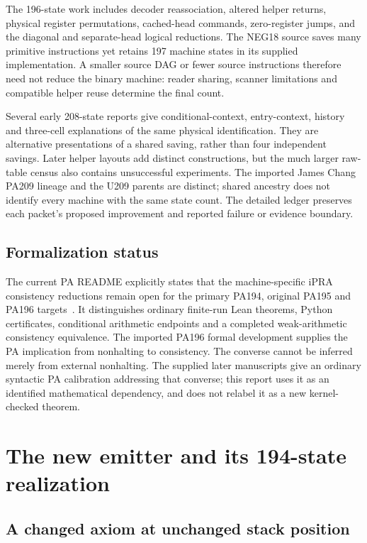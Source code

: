 \documentclass[11pt,letterpaper]{article}
\begin{document}
The 196-state work includes decoder reassociation, altered helper returns,
physical register permutations, cached-head commands, zero-register jumps,
and the diagonal and separate-head logical reductions. The NEG18 source
saves many primitive instructions yet retains 197 machine states in its
supplied implementation. A smaller source DAG or fewer source instructions
therefore need not reduce the binary machine: reader sharing, scanner
limitations and compatible helper reuse determine the final count.

Several early 208-state reports give conditional-context, entry-context,
history and three-cell explanations of the same physical identification.
They are alternative presentations of a shared saving, rather than four
independent savings. Later helper layouts add distinct constructions, but
the much larger raw-table census also contains unsuccessful experiments.
The imported James Chang PA209 lineage and the U209 parents are distinct;
shared ancestry does not identify every machine with the same state count.
The detailed ledger preserves each packet's proposed improvement and
reported failure or evidence boundary.

\subsection{Formalization status}

The current PA README explicitly states that the machine-specific iPRA
consistency reductions remain open for the primary PA194, original PA195
and PA196 targets~\cite{pa-readme}. It distinguishes ordinary finite-run
Lean theorems, Python certificates, conditional arithmetic endpoints and a
completed weak-arithmetic consistency equivalence. The imported PA196
formal development supplies the PA implication from nonhalting to
consistency. The converse cannot be inferred merely from external
nonhalting. The supplied later manuscripts give an ordinary syntactic
PA calibration addressing that converse; this report uses it as an
identified mathematical dependency, and does not relabel it as a new
kernel-checked theorem.

\section{The new emitter and its 194-state realization}

\subsection{A changed axiom at unchanged stack position}
\end{document}
